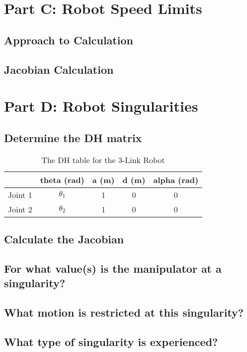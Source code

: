 \documentclass[12pt]{article}
\begin{document}
\section{Part C: Robot Speed Limits}
\subsection{Approach to Calculation}
\subsection{Jacobian Calculation}


\section{Part D: Robot Singularities}
\subsection{Determine the DH matrix}
\begin{table}[H]
    \centering
    \begin{tabular}{|c|c|c|c|c|}
        \hline
                & \textbf{theta (rad)} & \textbf{a (m)} & \textbf{d (m)} & \textbf{alpha (rad)} \\ \hline
        Joint 1 & $\theta_{1}$         & 1              & 0              & 0                    \\ \hline
        Joint 2 & $\theta_{2}$         & 1              & 0              & 0                    \\ \hline
    \end{tabular}
    \caption{The DH table for the 3-Link Robot}
    \label{table:3-Link Robot}
\end{table}
\subsection{Calculate the Jacobian}

\subsection{For what value(s) is the manipulator at a singularity?}
\subsection{What motion is restricted at this singularity?}
\subsection{What type of singularity is experienced?}
\end{document}
